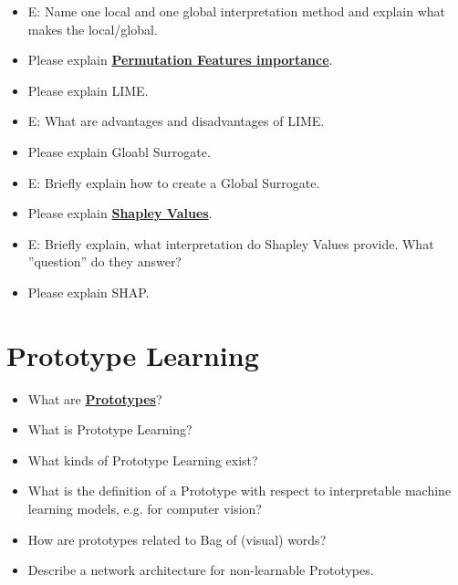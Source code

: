 \documentclass{report}
\begin{document}
	\begin{itemize}
	\item E: Name one local and one global interpretation method and explain what makes the local/global.
	\newline 
	
	\item Please explain \textbf{\underline{Permutation Features importance}}.
	\newline 
	\item Please explain LIME.
	\newline 
	\item E: What are advantages and disadvantages of LIME.
	\newline 
	\item Please explain Gloabl Surrogate.
	\newline 
	\item E: Briefly explain how to create a Global Surrogate.
	\newline 
	
	\item Please explain \textbf{\underline{Shapley Values}}.
	\newline 
	\item E: Briefly explain, what interpretation do Shapley Values provide. What ”question” do they answer?
	\newline 
	\item Please explain SHAP.
	\newline 
	
	\end{itemize}
	
	\section{Prototype Learning}
	
	\begin{itemize}
	\item What are \textbf{\underline{Prototypes}}?
	\newline 
	\item What is Prototype Learning?
	\newline 
	\item What kinds of Prototype Learning exist?
	\newline 
	\item What is the definition of a Prototype with respect to interpretable machine learning models, e.g. for computer vision?
	\newline 
	\item How are prototypes related to Bag of (visual) words?
	\newline 
	\item Describe a network architecture for non-learnable Prototypes.
	\newline 
	\end{itemize}
	
\end{document}
